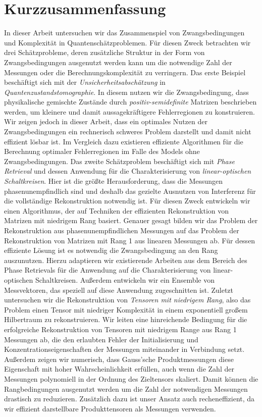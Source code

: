 \documentclass[
  a4paper,
  11pt,
  BCOR=8mm,
  twoside,
  headsepline]{scrbook}
\begin{document}
\chapter*{Kurzzusammenfassung}
\pagestyle{blank}

In dieser Arbeit untersuchen wir das Zusammenspiel von Zwangsbedingungen und Komplexität in Quantenschätzproblemen.
Für diesen Zweck betrachten wir drei Schätzprobleme, deren zusätzliche Struktur in der Form von Zwangsbedingungen ausgenutzt werden kann um die notwendige Zahl der Messungen oder die Berechnungskomplexität zu verringern.
Das erste Beispiel beschäftigt sich mit der \emph{Unsicherheitsabschätzung} in \emph{Quantenzustandstomographie}.
In diesem nutzen wir die Zwangsbedingung, dass physikalische gemischte Zustände durch \emph{positiv-semidefinite} Matrizen beschrieben werden, um kleinere und damit aussagekräftigere Fehlerregionen zu konstruieren.
Wir zeigen jedoch in dieser Arbeit, dass ein optimales Nutzen der Zwangsbedingungen ein rechnerisch schweres Problem darstellt und damit nicht effizient lösbar ist.
Im Vergleich dazu existieren effiziente Algorithmen f\"ur die Berechnung optimaler Fehlerregionen im Falle des Models ohne Zwangsbedingungen.
Das zweite Schätzproblem beschäftigt sich mit \emph{Phase Retrieval} und dessen Anwendung für die Charakterisierung von \emph{linear-optischen Schaltkreisen}.
Hier ist die größte Herausforderung, dass die Messungen phasenunempfindlich sind und deshalb das gezielte Ausnutzen von Interferenz für die vollständige Rekonstruktion notwendig ist.
Für diesen Zweck entwickeln wir einen Algorithmus, der auf Techniken der effizienten Rekonstruktion von Matrizen mit niedrigem Rang basiert.
Genauer gesagt bilden wir das Problem der Rekonstruktion aus phasenunempfindlichen Messungen auf das Problem der Rekonstruktion von Matrizen mit Rang 1 aus linearen Messungen ab.
Für dessen effiziente Lösung ist es notwendig die Zwangsbedingung an den Rang auszunutzen.
Hierzu adaptieren wir existierende Arbeiten aus dem Bereich des Phase Retrievals f\"ur die Anwendung auf die Charakterisierung von linear-optischen Schaltkreisen.
Außerdem entwickeln wir ein Ensemble von Messvektoren, das speziell auf diese Anwendung zugeschnitten ist.
Zuletzt untersuchen wir die Rekonstruktion von \emph{Tensoren mit niedrigem Rang}, also das Problem einen Tensor mit niedriger Komplexität in einem exponentiell großem Hilbertraum zu rekonstruieren.
Wir leiten eine hinreichende Bedingung für die erfolgreiche Rekonstruktion von Tensoren mit niedrigem Range aus Rang 1 Messungen ab, die den erlaubten Fehler der Initialisierung und Konzentrationseigenschaften der Messungen miteinander in Verbindung setzt.
Außerdem zeigen wir numerisch, dass Gauss'sche Produktmessungen diese Eigenschaft mit hoher Wahrscheinlichkeit erfüllen, auch wenn die Zahl der Messungen polynomiell in der Ordnung des Zieltensors skaliert.
Damit können die Rangbedingungen ausgenutzt werden um die Zahl der notwendigen Messungen drastisch zu reduzieren.
Zusätzlich dazu ist unser Ansatz auch recheneffizient, da wir effizient darstellbare Produkttensoren als Messungen verwenden.
\end{document}
